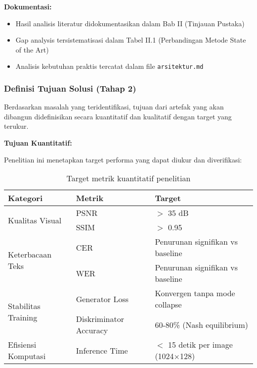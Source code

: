\documentclass[12pt,a4paper]{article}
\begin{document}
\textbf{Dokumentasi:}
\begin{itemize}[leftmargin=*, nosep]
\item Hasil analisis literatur didokumentasikan dalam Bab II (Tinjauan Pustaka)
\item Gap analysis tersistematisasi dalam Tabel II.1 (Perbandingan Metode State of the Art)
\item Analisis kebutuhan praktis tercatat dalam file \texttt{arsitektur.md}
\end{itemize}

\subsubsection{Definisi Tujuan Solusi (Tahap 2)}
\label{subsubsec:definisi-tujuan}

Berdasarkan masalah yang teridentifikasi, tujuan dari artefak yang akan dibangun didefinisikan secara kuantitatif dan kualitatif dengan target yang terukur.
\newline

\textbf{Tujuan Kuantitatif:}

Penelitian ini menetapkan target performa yang dapat diukur dan diverifikasi:

\begin{table}[H]
\centering
\caption{Target metrik kuantitatif penelitian}
\label{tab:target-metrik}
\small
\begin{tabular}{|l|l|l|}
\hline
\textbf{Kategori} & \textbf{Metrik} & \textbf{Target} \\ \hline
\multirow{2}{*}{Kualitas Visual} & PSNR & $>$ 35 dB \\ \cline{2-3}
 & SSIM & $>$ 0.95 \\ \hline
\multirow{2}{*}{Keterbacaan Teks} & CER & Penurunan signifikan vs baseline \\ \cline{2-3}
 & WER & Penurunan signifikan vs baseline \\ \hline
\multirow{2}{*}{Stabilitas Training} & Generator Loss & Konvergen tanpa mode collapse \\ \cline{2-3}
 & Diskriminator Accuracy & 60-80\% (Nash equilibrium) \\ \hline
Efisiensi Komputasi & Inference Time & $<$ 15 detik per image (1024$\times$128) \\ \hline
\end{tabular}
\end{table}
\end{document}
